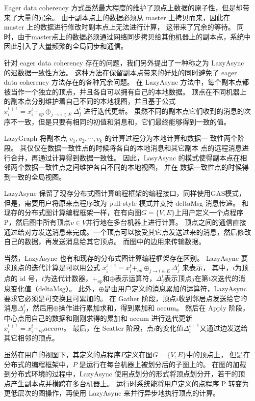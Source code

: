 Eager data coherency 方式虽然最大程度的维护了顶点上数据的原子性，但是却带来了大量的冗余。
由于副本点上的数据必须从 master 上拷贝而来，因此在 master 上的数据进行修改时副本点上无法进行计算，
这带来了冗余的等待。
同时，由于master点上的数据必须通过网络同步拷贝给其他机器上的副本点，系统中因此引入了大量频繁的全局同步和通信。

针对 eager data coherency 存在的问题，我们另外提出了一种称之为 LazyAsync 的迟数据一致性方法。
这种方法在保留副本点带来的好处的同时避免了 eager data coherency 方法存在的各种冗余问题。
在 LazyAsync 方法中，每个副本点都被当作一个独立的顶点，并且各自可以拥有自己的本地数据。
顶点在不同机器上的副本点分别维护着自己不同的本地视图，并且基于公式
$x_{i}^{t+1}=x_{i}^{t}+_{o p} \oplus_{j \rightarrow i \in E} \Delta_{j}^{t}$
进行迭代更新。
虽然不同的副本点它们收到的消息的次序不一致，但是只要有相同的初值和消息和，它们最终能够得到一致的值。

LazyGraph 将副本点 $v_1,v_2,\cdots,v_k$ 的计算过程分为本地计算和数据一 致性两个阶段。
其仅仅在数据一致性点的时候将各自的本地消息和其它副本 点的远程消息进行合并，再通过计算得到数据一致性。
因此，LasyAsync 的模式使得副本点在相邻两个数据一致性点之间维护各自不同的本地视图，
并在 数据一致性点的时候得到一致的全局视图。


LazyAsync 保留了现存分布式图计算编程框架的编程接口，同样使用GAS模式，
但是，需要用户将原来点程序改为 pull-style 模式并支持 deltaMsg 消息传递。
和现存的分布式图计算编程框架一样，在有向图$G = \{V, E\}$上用户定义一个点程序 P，然后图中所有顶点$v \in V$并行地在多台机器上进行计算。
顶点之间的通信直接通过给对方发送消息来完成。一个顶点可以接受其它点发送过来的消息，然后修改自己的数据，再发送消息给其它顶点。
而图中的边用来传输数据。


当然，LazyAsync 也有和现存的分布式图计算编程框架存在区别。
LazyAsync 要求顶点的迭代计算是可以用公式 $x_i^{t+1} = x_i^t +_{op} \oplus_{j \rightarrow i \in E} \Delta_j^t$ 来表示，
其中，$i$为顶点的 id 号，$t$为迭代计数器，$+_{op}$和$\oplus$表示运算符，$\Delta_j^t$表示顶点$j$在第t次迭代的消息变化值（deltaMsg）。
此外，$\oplus$是由用户定义的消息累加的运算符，LazyAsync 要求它必须是可交换且可累加的。
在 Gather 阶段，顶点$i$收到邻居点发送给它的消息$\Delta_j^t$，然后用$\oplus$操作进行累加求和，得到累加和 accum。
然后在 Apply 阶段，中心点用自己的数据和刚刚求得的累加和 accum 进行迭代更新$x_i^{t+1} = x_i^t +_{op} accum$。
最后，在 Scatter 阶段，点$i$的变化值$\Delta_i^{t+1}$又通过边发送给其它相邻的顶点。


虽然在用户的视图下，其定义的点程序$P$定义在图$G = \{V, E\}$中的顶点上，
但是在分布式的编程框架中，$P$ 是运行在每台机器上被划分后的子图上的。
在图的加载到分布式环境的过程中，LazyAsync 使用点划分的形式将顶点划分开，若干的顶点产生副本点并横跨在多台机器上。
运行时系统能将用户定义的点程序 P 转变为更低层次的图操作，再使用 LazyAsync 来并行异步地执行顶点的计算。

